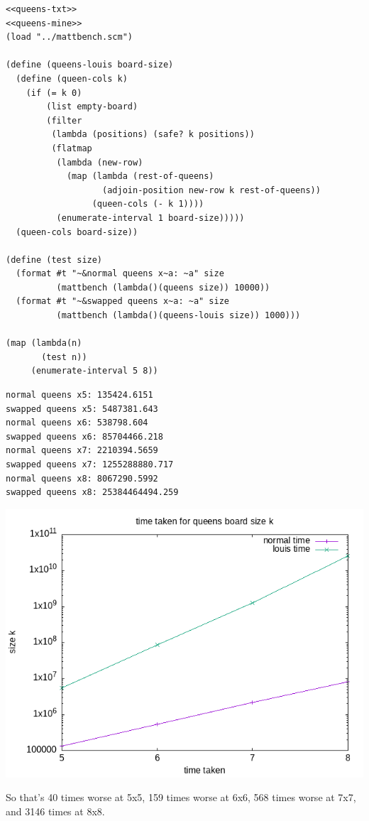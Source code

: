 \documentclass[final,fleqn,titlepage,twoside]{article}
\begin{document}
\begin{verbatim}
<<queens-txt>>
<<queens-mine>>
(load "../mattbench.scm")

(define (queens-louis board-size)
  (define (queen-cols k)
    (if (= k 0)
        (list empty-board)
        (filter
         (lambda (positions) (safe? k positions))
         (flatmap
          (lambda (new-row)
            (map (lambda (rest-of-queens)
                   (adjoin-position new-row k rest-of-queens))
                 (queen-cols (- k 1))))
          (enumerate-interval 1 board-size)))))
  (queen-cols board-size))

(define (test size)
  (format #t "~&normal queens x~a: ~a" size
          (mattbench (lambda()(queens size)) 10000))
  (format #t "~&swapped queens x~a: ~a" size
          (mattbench (lambda()(queens-louis size)) 1000)))

(map (lambda(n)
       (test n))
     (enumerate-interval 5 8))
\end{verbatim}

\begin{verbatim}
normal queens x5: 135424.6151
swapped queens x5: 5487381.643
normal queens x6: 538798.604
swapped queens x6: 85704466.218
normal queens x7: 2210394.5659
swapped queens x7: 1255288880.717
normal queens x8: 8067290.5992
swapped queens x8: 25384464494.259
\end{verbatim}

\begin{center}
\includegraphics[width=.9\linewidth]{2/fig/2-43.png}
\end{center}

So that's 40 times worse at 5x5, 159 times worse at 6x6, 568 times worse at 7x7,
and 3146 times at 8x8.
\end{document}
